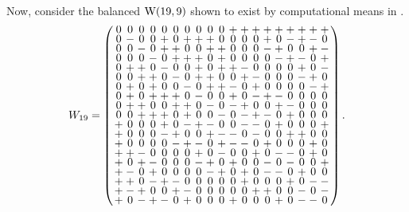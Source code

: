 \documentclass[../../../main]{subfiles}
\begin{document}
 Now, consider the balanced $\text{W}(19,9)$ shown to exist by computational means in \cite{bgw-19-9-4}.
 \[
  W_{19}=
  \arraycolsep=1.25pt\def\arraystretch{0.625}
  \left(\begin{array}{ccccccccccccccccccc}
0&0&0&0&0&0&0&0&0&0&+&+&+&+&+&+&+&+&+\\
0&-&0&0&+&0&+&+&+&0&0&0&0&+&0&-&+&-&0\\
0&0&-&0&+&+&0&0&+&+&0&0&0&-&+&0&0&+&-\\
0&0&0&-&0&+&+&+&0&+&0&0&0&0&-&+&-&0&+\\
0&+&+&0&-&0&0&+&0&+&+&-&0&0&0&0&+&0&-\\
0&0&+&+&0&-&0&+&+&0&0&+&-&0&0&0&-&+&0\\
0&+&0&+&0&0&-&0&+&+&-&0&+&0&0&0&0&-&+\\
0&+&0&+&+&+&0&-&0&0&+&0&-&+&-&0&0&0&0\\
0&+&+&0&0&+&+&0&-&0&-&+&0&0&+&-&0&0&0\\
0&0&+&+&+&0&+&0&0&-&0&-&+&-&0&+&0&0&0\\
+&0&0&0&+&0&-&+&-&0&0&-&-&0&+&0&0&0&+\\
+&0&0&0&-&+&0&0&+&-&-&0&-&0&0&+&+&0&0\\
+&0&0&0&0&-&+&-&0&+&-&-&0&+&0&0&0&+&0\\
+&+&-&0&0&0&0&+&0&-&0&0&+&0&-&-&0&+&0\\
+&0&+&-&0&0&0&-&+&0&+&0&0&-&0&-&0&0&+\\
+&-&0&+&0&0&0&0&-&+&0&+&0&-&-&0&+&0&0\\
+&+&0&-&+&-&0&0&0&0&0&+&0&0&0&+&0&-&-\\
+&-&+&0&0&+&-&0&0&0&0&0&+&+&0&0&-&0&-\\
+&0&-&+&-&0&+&0&0&0&+&0&0&0&+&0&-&-&0\\
  \end{array}\right).
 \]
 
\end{document}
